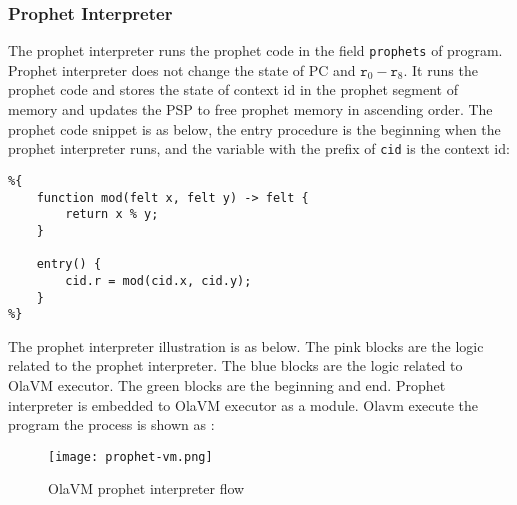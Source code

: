 \subsubsection{Prophet Interpreter}\label{subsec: prophet-interpreter}

The prophet interpreter runs the prophet code in the field \verb|prophets| of program.
Prophet interpreter does not change the state of PC and $\texttt{r}_0 - \texttt{r}_8$.
It runs the prophet code and stores the state of context id in the prophet segment of memory and updates the PSP to free prophet memory in ascending order.
The prophet code snippet is as below, the entry procedure is the beginning when the prophet interpreter runs, and the variable with the prefix of \verb|cid| is the context id:
\begin{lstlisting}
%{
    function mod(felt x, felt y) -> felt {
        return x % y;
    }

    entry() {
        cid.r = mod(cid.x, cid.y);
    }
%}
\end{lstlisting}

The prophet interpreter illustration is as below.
The pink blocks are the logic related to the prophet interpreter.
The blue blocks are the logic related to OlaVM executor.
The green blocks are the beginning and end.
Prophet interpreter is embedded to OlaVM executor as a module.
Olavm execute the program the process is shown as :
\begin{figure}[!htp]
    \centering
    \texttt{[image: prophet-vm.png]}
    \caption{OlaVM prophet interpreter flow}
    \label{fig:prophet-interpreter-logic}
\end{figure}
